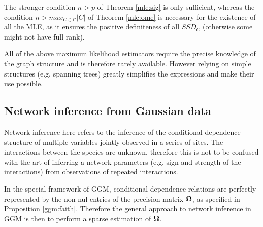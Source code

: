 The stronger condition $n>p$ of Theorem \ref{mle:sig} is only sufficient, whereas the condition $n>max_{C\in\mathcal{C}}|C|$ of Theorem \ref{mle:ome} is necessary for the existence of all the MLE, as it ensures the positive definiteness of all $SSD_C$ (otherwise some might not have full rank).  

 All of the above maximum likelihood estimators require the precise knowledge of the graph structure and is therefore rarely available. However relying on simple structures (e.g. spanning trees) greatly simplifies the expressions and make their use possible.

\subsection{Network inference from Gaussian data}
  Network inference here refers to the inference of the conditional dependence structure of multiple variables jointly observed in a series of sites. The interactions between the species are unknown, therefore this is not to be confused with the art of inferring a network parameters (e.g. sign and strength of the interactions) from observations of repeated interactions.
  
In the special framework of GGM, conditional dependence relations are perfectly represented by the non-nul entries of the precision matrix ${\boldsymbol{\Omega}}$, as specified in Proposition \ref{ggm:faith}. Therefore the general approach to network inference in GGM is then to perform a sparse estimation of ${\boldsymbol{\Omega}}$.

